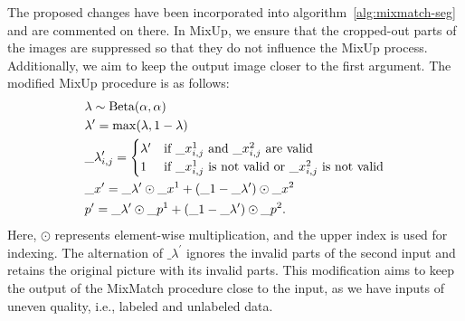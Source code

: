 The proposed changes have been incorporated into algorithm~\ref{alg:mixmatch-seg} and are commented on there. In MixUp, we 
ensure that the cropped-out parts of the images are suppressed so that they do not influence the MixUp process. 
Additionally, we aim to keep the output image closer to the first argument. The modified MixUp procedure is as follows:
\begin{align}
  &\lambda \sim \text{Beta}(\alpha,\alpha) \notag\\
  &\lambda^\prime = \max(\lambda,1-\lambda) \notag\\
  &\_\lambda^\prime_{i,j} =\begin{cases}
    \lambda^\prime & \text{if } \_x^{1}_{i,j} \text{ and }  \_x^{2}_{i,j} \text{ are valid}\\
    1 & \text{if }  \_x^{1}_{i,j} \text{ is not valid or }  \_x^{2}_{i,j} \text{ is not valid}\\
  \end{cases} \label{eq:mixup_alternated}\\
  &\_x^\prime = \_\lambda^\prime \odot \_x^1 + (\_1-\_\lambda^\prime) \odot \_x^2 \notag\\
  &p^\prime = \_\lambda^\prime \odot \_p^1 + (\_1-\_\lambda^\prime) \odot \_p^2. \notag
\end{align}
Here, $\odot$ represents element-wise multiplication, and the upper index is used for indexing. The alternation
 of $\_{\lambda}^\prime$ ignores the invalid parts of the second input and retains the original picture 
 with its invalid parts. This modification aims to keep the output of the MixMatch procedure close to the input, as 
 we have inputs of uneven quality, i.e., labeled and unlabeled data.

